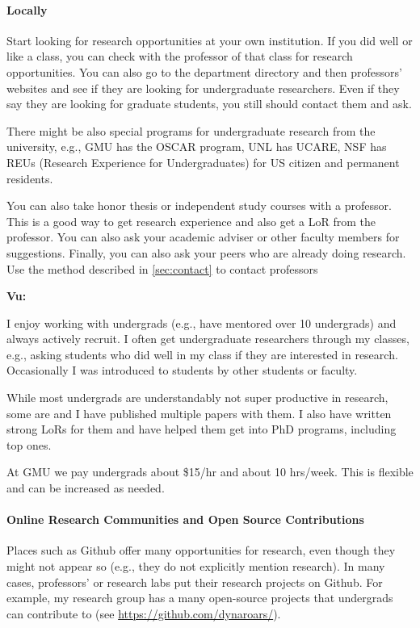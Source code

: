 \documentclass[oneside,11pt,dvipsnames]{book}
\newenvironment{commentbox}[1][]{
  \small
  \begin{mybox}
    {\small \textbf{#1}}
  }{
  \end{mybox}
}
\begin{document}
\paragraph{Locally} Start looking for research opportunities at your own institution.
If you did well or like a class, you can check with the professor of that class for research opportunities.
You can also go to the department directory and then professors' websites and see if they are looking for undergraduate researchers.
Even if they say they are looking for graduate students, you still should contact them and ask.

There might be also special programs for undergraduate research from the university, e.g., GMU has the OSCAR program, UNL has UCARE, NSF has REUs (Research Experience for Undergraduates) for US citizen and permanent residents.

You can also take honor thesis or independent study courses with a professor.  This is a good way to get research experience and also get a LoR from the professor.  You can also ask your academic adviser or other faculty members for suggestions.  Finally, you can also ask your peers who are already doing research.  Use the method described in \autoref{sec:contact} to contact professors


\begin{commentbox}[Vu:]
    I enjoy working with undergrads (e.g., have mentored over 10 undergrads) and always actively recruit.
    I often get undergraduate researchers through my classes, e.g., asking students who did well in my class if they are interested in research.  Occasionally I was introduced to students by other students or faculty.

    While most undergrads are understandably not super productive in research, some are and I have published multiple papers with them.  I also have written strong LoRs for them and have helped them get into PhD programs, including top ones.

    \tcblower
    At GMU we pay undergrads about \$15/hr and about 10 hrs/week. This is flexible and can be increased as needed.
\end{commentbox}

\paragraph{Online Research Communities and Open Source Contributions} Places such as Github offer many opportunities for research, even though they might not appear so (e.g., they do not explicitly mention research).
In many cases, professors' or research labs put their research projects on Github. For example, my research group has a many open-source projects that undergrads can contribute to (see \url{https://github.com/dynaroars/}).
\end{document}
